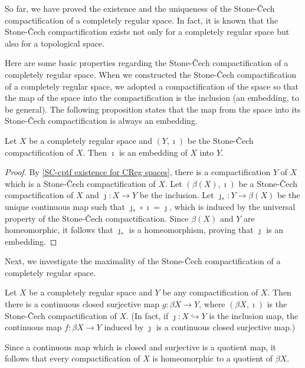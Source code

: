 So far, we have proved the existence and the uniqueness of the Stone-\v{C}ech compactification of a completely regular space.
In fact, it is known that the Stone-\v{C}ech compactification exists not only for a completely regular space but also for a topological space.

Here are some basic properties regarding the Stone-\v{C}ech compactification of a completely regular space.
When we constructed the Stone-\v{C}ech compactification of a completely regular space, we adopted a compactification of the space so that the map of the space into the compactification is the inclusion (an embedding, to be general).
The following proposition states that the map from the space into its Stone-\v{C}ech compactification is always an embedding.
\begin{prop}
    Let $X$ be a completely regular space and $(Y, \imath)$ be the Stone-\v{C}ech compactification of $X$.
    Then $\imath$ is an embedding of $X$ into $Y$.
\end{prop}
\begin{proof}
    By \cref{SC-cptf existence for CReg spaces}, there is a compactification $Y$ of $X$ which is a Stone-\v{C}ech compactification of $X$.
    Let $(\beta(X), \imath)$ be a Stone-\v{C}ech compactification of $X$ and $\jmath: X\rightarrow Y$ be the inclusion.
    Let $\jmath_*: Y\rightarrow \beta(X)$ be the unique continuous map such that $\jmath_*\circ\imath=\jmath$, which is induced by the universal property of the Stone-\v{C}ech compactification.
    Since $\beta(X)$ and $Y$ are homeomorphic, it follows that $\jmath_*$ is a homeomorphism, proving that $\jmath$ is an embedding.
\end{proof}
Next, we investigate the maximality of the Stone-\v{C}ech compactification of a completely regular space.
\begin{prop}
    Let $X$ be a completely regular space and $Y$ be any compactification of $X$.
    Then there is a continuous closed surjective map $g: \beta X\rightarrow Y$, where $(\beta X, \imath)$ is the Stone-\v{C}ech compactification of $X$.
    (In fact, if $\jmath: X\hookrightarrow Y$ is the inclusion map, the continuous map $f: \beta X\rightarrow Y$ induced by $\jmath$ is a continuous closed surjective map.)
\end{prop}
\begin{rmk}
    Since a continuous map which is closed and surjective is a quotient map, it follows that every compactification of $X$ is homeomorphic to a quotient of $\beta X$.
\end{rmk}
